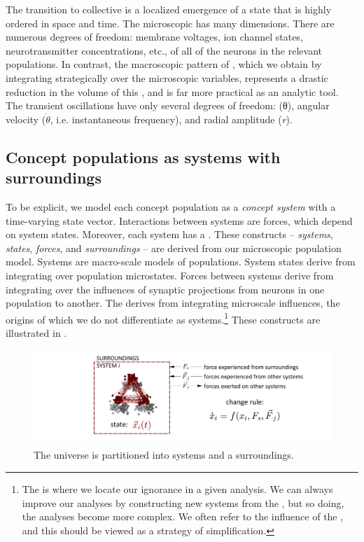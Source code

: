   The transition to collective  is a localized emergence of a state that is highly ordered in space and time. The microscopic  has many dimensions. There are numerous degrees of freedom: membrane voltages, ion channel states, neurotransmitter concentrations, etc., of all of the neurons in the relevant populations. In contrast, the macroscopic pattern of , which we obtain by integrating strategically over the microscopic variables, represents a drastic reduction in the volume of this , and is far more practical as an analytic tool. The transient oscillations have only several degrees of freedom:  (θ), angular velocity ($\dot{\theta}$, i.e. instantaneous frequency), and radial amplitude (\textit{r}).

\subsection{Concept populations as systems with surroundings} 

To be explicit, we model each concept population as a \textit{concept system} with a time-varying state vector. Interactions between systems are forces, which depend on system states. Moreover, each system has a . These constructs -- \textit{systems}, \textit{states}, \textit{forces}, and \textit{surroundings} -- are derived from our microscopic population model. Systems are macro-scale models of populations. System states derive from integrating over population microstates. Forces between systems derive from integrating over the influences of synaptic projections from neurons in one population to another. The  derives from integrating microscale influences, the origins of which we do not differentiate as systems.\footnote{The  is where we locate our ignorance in a given analysis. We can always improve our analyses by constructing new systems from the , but so doing, the analyses become more complex. We often refer to the influence of the , and this should be viewed as a strategy of simplification.} These constructs are illustrated in {}.

  
\begin{figure}
\includegraphics[width=\textwidth]{figures/Tilsen-img11.png}
\caption{The universe is partitioned into systems and a surroundings.}
\label{fig:2:4}
\end{figure}
 

